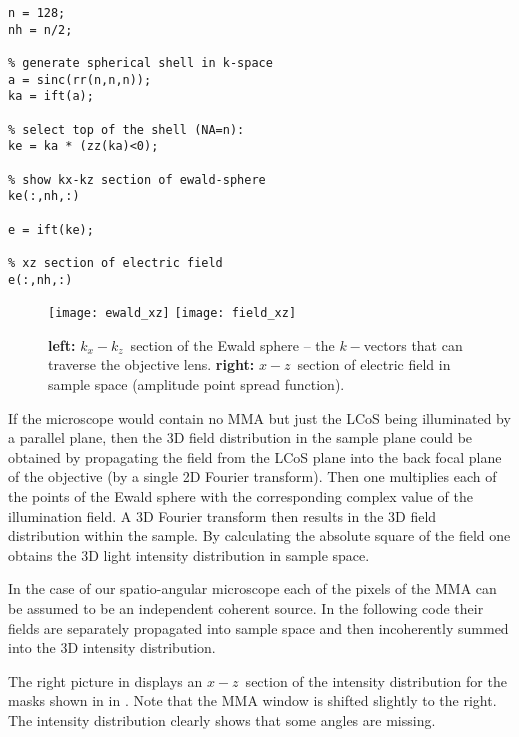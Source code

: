 {\small
\begin{verbatim}
n = 128;
nh = n/2;

% generate spherical shell in k-space
a = sinc(rr(n,n,n));
ka = ift(a);

% select top of the shell (NA=n):
ke = ka * (zz(ka)<0);

% show kx-kz section of ewald-sphere
ke(:,nh,:)

e = ift(ke);

% xz section of electric field
e(:,nh,:)
\end{verbatim}

\begin{figure}[!hbt]
  \centering
  \texttt{[image: ewald\_xz]}
  \quad\quad
  \texttt{[image: field\_xz]}
  \caption{{\bf left:} $k_x-k_z$~section of the Ewald sphere -- the
    $k-$vectors that can traverse the objective lens. {\bf
      right:} $x-z$~section of
    electric field in sample space (amplitude point spread function).}
  \label{fig:simple-apsf}
\end{figure}

If the microscope would contain no MMA but just the LCoS being
illuminated by a parallel plane, then the 3D field distribution in the
sample plane could be obtained by propagating the field from the LCoS
plane into the back focal plane of the objective (by a single 2D
Fourier transform). Then one multiplies each of the points of the
Ewald sphere with the corresponding complex value of the illumination
field. A 3D Fourier transform then results in the 3D field
distribution within the sample. By calculating the absolute square of
the field one obtains the 3D light intensity distribution in sample
space.

In the case of our spatio-angular microscope each of the pixels of the
MMA can be assumed to be an independent coherent source. In the
following code their fields are separately propagated into sample
space and then incoherently summed into the 3D intensity distribution.

The right picture in  displays an
$x-z$~section of the intensity distribution for the masks shown in in
. Note that the MMA window is shifted
slightly to the right. The intensity distribution clearly shows that
some angles are missing.

}
